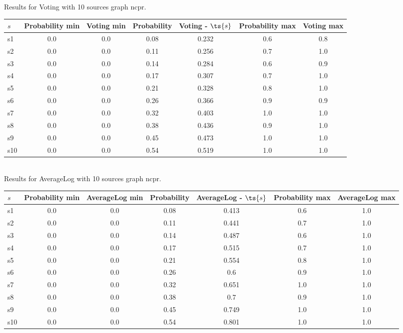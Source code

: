 \documentclass{article}
\begin{document}
\noindent Results for Voting with 10 sources graph ncpr.

\noindent\begin{tabular}{|l|c|c|c|c|c|c|}
\hline
$s$& Probability min & Voting min & Probability & Voting - $\ts{s}$ & Probability max & Voting max\\
\hline
s1 &0.0 & 0.0 & 0.08 & 0.232 & 0.6 & 0.8\\
\hline
s2 &0.0 & 0.0 & 0.11 & 0.256 & 0.7 & 1.0\\
\hline
s3 &0.0 & 0.0 & 0.14 & 0.284 & 0.6 & 0.9\\
\hline
s4 &0.0 & 0.0 & 0.17 & 0.307 & 0.7 & 1.0\\
\hline
s5 &0.0 & 0.0 & 0.21 & 0.328 & 0.8 & 1.0\\
\hline
s6 &0.0 & 0.0 & 0.26 & 0.366 & 0.9 & 0.9\\
\hline
s7 &0.0 & 0.0 & 0.32 & 0.403 & 1.0 & 1.0\\
\hline
s8 &0.0 & 0.0 & 0.38 & 0.436 & 0.9 & 1.0\\
\hline
s9 &0.0 & 0.0 & 0.45 & 0.473 & 1.0 & 1.0\\
\hline
s10 &0.0 & 0.0 & 0.54 & 0.519 & 1.0 & 1.0\\
\hline
\end{tabular}\\

\noindent Results for AverageLog with 10 sources graph ncpr.

\noindent\begin{tabular}{|l|c|c|c|c|c|c|}
\hline
$s$& Probability min & AverageLog min & Probability & AverageLog - $\ts{s}$ & Probability max & AverageLog max\\
\hline
s1 &0.0 & 0.0 & 0.08 & 0.413 & 0.6 & 1.0\\
\hline
s2 &0.0 & 0.0 & 0.11 & 0.441 & 0.7 & 1.0\\
\hline
s3 &0.0 & 0.0 & 0.14 & 0.487 & 0.6 & 1.0\\
\hline
s4 &0.0 & 0.0 & 0.17 & 0.515 & 0.7 & 1.0\\
\hline
s5 &0.0 & 0.0 & 0.21 & 0.554 & 0.8 & 1.0\\
\hline
s6 &0.0 & 0.0 & 0.26 & 0.6 & 0.9 & 1.0\\
\hline
s7 &0.0 & 0.0 & 0.32 & 0.651 & 1.0 & 1.0\\
\hline
s8 &0.0 & 0.0 & 0.38 & 0.7 & 0.9 & 1.0\\
\hline
s9 &0.0 & 0.0 & 0.45 & 0.749 & 1.0 & 1.0\\
\hline
s10 &0.0 & 0.0 & 0.54 & 0.801 & 1.0 & 1.0\\
\hline
\end{tabular}\\
\end{document}
